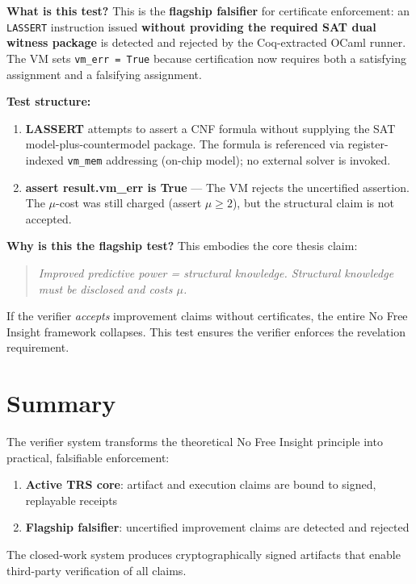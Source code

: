 \textbf{What is this test?} This is the \textbf{flagship falsifier} for certificate enforcement: an \texttt{LASSERT} instruction issued \textbf{without providing the required SAT dual witness package} is detected and rejected by the Coq-extracted OCaml runner. The VM sets \texttt{vm\_err = True} because certification now requires both a satisfying assignment and a falsifying assignment.

\textbf{Test structure:}
\begin{enumerate}
    \item \textbf{LASSERT} attempts to assert a CNF formula without supplying the SAT model-plus-countermodel package. The formula is referenced via register-indexed \texttt{vm\_mem} addressing (on-chip model); no external solver is invoked.

    \item \textbf{assert result.vm\_err is True} --- The VM rejects the uncertified assertion. The $\mu$-cost was still charged (assert $\mu \ge 2$), but the structural claim is not accepted.
\end{enumerate}

\textbf{Why is this the flagship test?} This embodies the core thesis claim:
\begin{quote}
\textit{Improved predictive power = structural knowledge. Structural knowledge must be disclosed and costs $\mu$.}
\end{quote}

If the verifier \textit{accepts} improvement claims without certificates, the entire No Free Insight framework collapses. This test ensures the verifier enforces the revelation requirement.

\section{Summary}


The verifier system transforms the theoretical No Free Insight principle into practical, falsifiable enforcement:

\begin{enumerate}
    \item \textbf{Active TRS core}: artifact and execution claims are bound to signed, replayable receipts
    \item \textbf{Flagship falsifier}: uncertified improvement claims are detected and rejected
\end{enumerate}

The closed-work system produces cryptographically signed artifacts that enable third-party verification of all claims.
